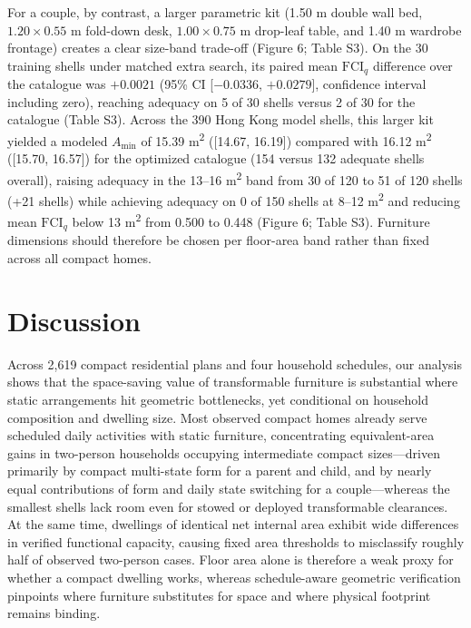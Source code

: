 \documentclass[12pt,letterpaper]{article}
\begin{document}
For a couple, by contrast, a larger parametric kit (1.50 m double wall bed, \(1.20 \times 0.55\text{ m}\) fold-down desk, \(1.00 \times 0.75\text{ m}\) drop-leaf table, and 1.40 m wardrobe frontage) creates a clear size-band trade-off (Figure 6; Table S3). On the 30 training shells under matched extra search, its paired mean \(\text{FCI}_q\) difference over the catalogue was \(+0.0021\) (95\% CI {[}\(-0.0336\), \(+0.0279\){]}, confidence interval including zero), reaching adequacy on 5 of 30 shells versus 2 of 30 for the catalogue (Table S3). Across the 390 Hong Kong model shells, this larger kit yielded a modeled \(A_{\min}\) of 15.39 m\textsuperscript{2} ({[}14.67, 16.19{]}) compared with 16.12 m\textsuperscript{2} ({[}15.70, 16.57{]}) for the optimized catalogue (154 versus 132 adequate shells overall), raising adequacy in the 13--16 m\textsuperscript{2} band from 30 of 120 to 51 of 120 shells (+21 shells) while achieving adequacy on 0 of 150 shells at 8--12 m\textsuperscript{2} and reducing mean \(\text{FCI}_q\) below 13 m\textsuperscript{2} from 0.500 to 0.448 (Figure 6; Table S3). Furniture dimensions should therefore be chosen per floor-area band rather than fixed across all compact homes.

\section{Discussion}\label{discussion}

Across 2,619 compact residential plans and four household schedules, our analysis shows that the space-saving value of transformable furniture is substantial where static arrangements hit geometric bottlenecks, yet conditional on household composition and dwelling size. Most observed compact homes already serve scheduled daily activities with static furniture, concentrating equivalent-area gains in two-person households occupying intermediate compact sizes---driven primarily by compact multi-state form for a parent and child, and by nearly equal contributions of form and daily state switching for a couple---whereas the smallest shells lack room even for stowed or deployed transformable clearances. At the same time, dwellings of identical net internal area exhibit wide differences in verified functional capacity, causing fixed area thresholds to misclassify roughly half of observed two-person cases. Floor area alone is therefore a weak proxy for whether a compact dwelling works, whereas schedule-aware geometric verification pinpoints where furniture substitutes for space and where physical footprint remains binding.
\end{document}
